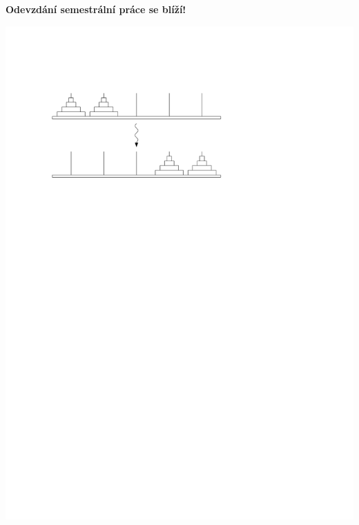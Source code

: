 \documentclass[usenames,dvipsnames,9pt]{beamer}
\begin{document}
\begin{frame}[standout]
  \begin{minipage}{0.4\linewidth}
    \begin{center}
      \textbf{\LARGE Odevzdání semestrální práce se blíží!}
    \end{center}

    \vspace{3em}


  \end{minipage}
  \hfill
  \begin{minipage}{0.5\linewidth}
    \vspace{.3em}
    \centering\includegraphics[width=\linewidth]{10/figs/hanoi.pdf}

  \end{minipage}

  \vspace{3em}



\end{frame}
\end{document}
